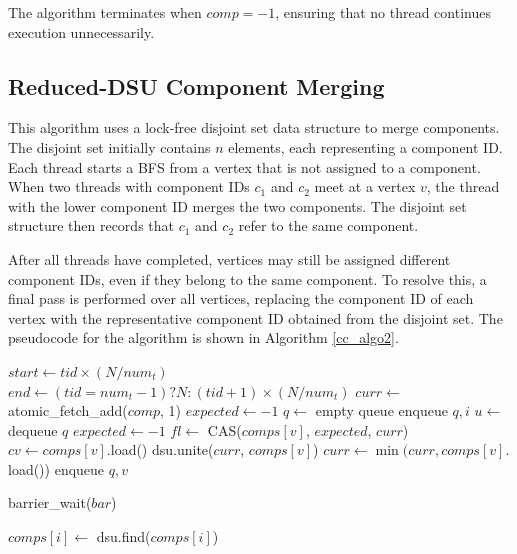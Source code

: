 The algorithm terminates when $comp = -1$, ensuring that no thread continues execution unnecessarily.

\subsection{Reduced-DSU Component Merging}

This algorithm uses a lock-free disjoint set data structure to merge components. The disjoint set initially contains $n$ elements, each representing a component ID. Each thread starts a BFS from a vertex that is not assigned to a component. When two threads with component IDs $c_1$ and $c_2$ meet at a vertex $v$, the thread with the lower component ID merges the two components. The disjoint set structure then records that $c_1$ and $c_2$ refer to the same component.

After all threads have completed, vertices may still be assigned different component IDs, even if they belong to the same component. To resolve this, a final pass is performed over all vertices, replacing the component ID of each vertex with the representative component ID obtained from the disjoint set. The pseudocode for the algorithm is shown in Algorithm \ref{cc_algo2}.

\begin{algorithm}
\caption{Parallel Connected Components with DSU}
\label{cc_algo2}
\begin{algorithmic}[1]
    \State $start \gets tid \times (N / num_t)$
    \State $end \gets (tid = num_t - 1) ? N : (tid + 1) \times (N / num_t)$
        \State $curr \gets$ atomic\_fetch\_add($comp$, 1)
        \State $expected \gets -1$
            \State $q \gets$ empty queue
            \State enqueue $q, i$
                \State $u \gets$ dequeue $q$
                    \State $expected \gets -1$
                    \State $fl \gets$ CAS($comps[v]$, $expected$, $curr$)
                        \State $cv \gets comps[v].$load()
                            \State dsu.unite($curr$, $comps[v]$)
                        \EndIf
                        \State $curr \gets \min(curr, comps[v].$load())
                    \Else
                        \State enqueue $q, v$
                    \EndIf
                \EndFor
            \EndWhile
        \EndIf
    \EndFor

    \State barrier\_wait($bar$)

        \State $comps[i] \gets$ dsu.find($comps[i]$)
    \EndFor
\EndProcedure
\end{algorithmic}
\end{algorithm}

